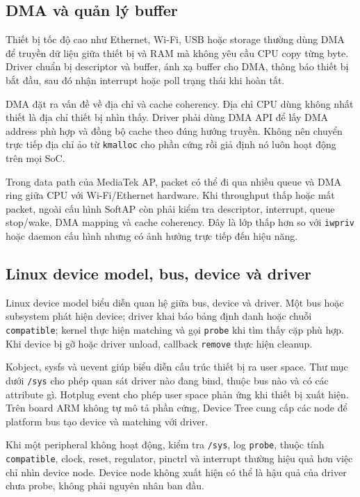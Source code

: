 \documentclass[11pt]{article}
\newcommand{\code}[1]{\texttt{#1}}
\begin{document}
\subsection{DMA và quản lý buffer}

Thiết bị tốc độ cao như Ethernet, Wi-Fi, USB hoặc storage thường dùng DMA để truyền dữ liệu giữa thiết bị và RAM mà không yêu cầu CPU copy từng byte. Driver chuẩn bị descriptor và buffer, ánh xạ buffer cho DMA, thông báo thiết bị bắt đầu, sau đó nhận interrupt hoặc poll trạng thái khi hoàn tất.

DMA đặt ra vấn đề về địa chỉ và cache coherency. Địa chỉ CPU dùng không nhất thiết là địa chỉ thiết bị nhìn thấy. Driver phải dùng DMA API để lấy DMA address phù hợp và đồng bộ cache theo đúng hướng truyền. Không nên chuyển trực tiếp địa chỉ ảo từ \code{kmalloc} cho phần cứng rồi giả định nó luôn hoạt động trên mọi SoC.

Trong data path của MediaTek AP, packet có thể đi qua nhiều queue và DMA ring giữa CPU với Wi-Fi/Ethernet hardware. Khi throughput thấp hoặc mất packet, ngoài cấu hình SoftAP còn phải kiểm tra descriptor, interrupt, queue stop/wake, DMA mapping và cache coherency. Đây là lớp thấp hơn so với \code{iwpriv} hoặc daemon cấu hình nhưng có ảnh hưởng trực tiếp đến hiệu năng.

\subsection{Linux device model, bus, device và driver}

Linux device model biểu diễn quan hệ giữa bus, device và driver. Một bus hoặc subsystem phát hiện device; driver khai báo bảng định danh hoặc chuỗi \code{compatible}; kernel thực hiện matching và gọi \code{probe} khi tìm thấy cặp phù hợp. Khi device bị gỡ hoặc driver unload, callback \code{remove} thực hiện cleanup.

Kobject, sysfs và uevent giúp biểu diễn cấu trúc thiết bị ra user space. Thư mục dưới \code{/sys} cho phép quan sát driver nào đang bind, thuộc bus nào và có các attribute gì. Hotplug event cho phép user space phản ứng khi thiết bị xuất hiện. Trên board ARM không tự mô tả phần cứng, Device Tree cung cấp các node để platform bus tạo device và matching với driver.

Khi một peripheral không hoạt động, kiểm tra \code{/sys}, log \code{probe}, thuộc tính \code{compatible}, clock, reset, regulator, pinctrl và interrupt thường hiệu quả hơn việc chỉ nhìn device node. Device node không xuất hiện có thể là hậu quả của driver chưa probe, không phải nguyên nhân ban đầu.
\end{document}
